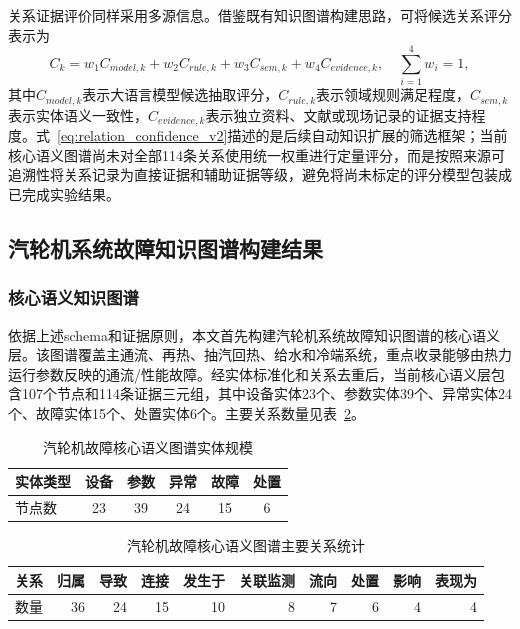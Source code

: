 关系证据评价同样采用多源信息。借鉴既有知识图谱构建思路，可将候选关系评分表示为
\begin{equation}
C_k=w_1C_{model,k}+w_2C_{rule,k}+w_3C_{sem,k}+w_4C_{evidence,k},\quad \sum_{i=1}^{4}w_i=1,
\label{eq:relation_confidence_v2}
\end{equation}
其中$C_{model,k}$表示大语言模型候选抽取评分，$C_{rule,k}$表示领域规则满足程度，$C_{sem,k}$表示实体语义一致性，$C_{evidence,k}$表示独立资料、文献或现场记录的证据支持程度。式~\eqref{eq:relation_confidence_v2}描述的是后续自动知识扩展的筛选框架；当前核心语义图谱尚未对全部114条关系使用统一权重进行定量评分，而是按照来源可追溯性将关系记录为直接证据和辅助证据等级，避免将尚未标定的评分模型包装成已完成实验结果。

\subsection{汽轮机系统故障知识图谱构建结果}
\label{subsec:kg_result_v2}

\subsubsection{核心语义知识图谱}

依据上述schema和证据原则，本文首先构建汽轮机系统故障知识图谱的核心语义层。该图谱覆盖主通流、再热、抽汽回热、给水和冷端系统，重点收录能够由热力运行参数反映的通流/性能故障。经实体标准化和关系去重后，当前核心语义层包含107个节点和114条证据三元组，其中设备实体23个、参数实体39个、异常实体24个、故障实体15个、处置实体6个。主要关系数量见表~\ref{tab:kg_relation_stats}。

\begin{table}[htbp]
\centering
\caption{汽轮机故障核心语义图谱实体规模}
\label{tab:kg_entity_stats_v2}
\begin{tabular}{lccccc}
\toprule
实体类型 & 设备 & 参数 & 异常 & 故障 & 处置 \\
\midrule
节点数 & 23 & 39 & 24 & 15 & 6 \\
\bottomrule
\end{tabular}
\end{table}

\begin{table}[htbp]
\centering
\caption{汽轮机故障核心语义图谱主要关系统计}
\label{tab:kg_relation_stats}
\begin{tabular}{lrrrrrrrrr}
\toprule
关系 & 归属 & 导致 & 连接 & 发生于 & 关联监测 & 流向 & 处置 & 影响 & 表现为 \\
\midrule
数量 & 36 & 24 & 15 & 10 & 8 & 7 & 6 & 4 & 4 \\
\bottomrule
\end{tabular}
\end{table}

